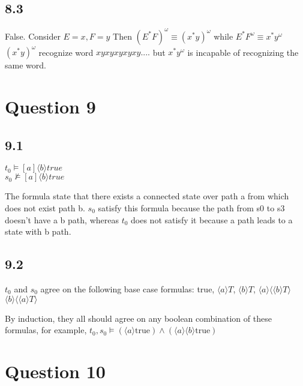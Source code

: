 \documentclass[a4paper, 11pt]{article}
\begin{document}
\subsection*{8.3}
False. Consider $E = x, F = y$ Then $(E^*F)^\omega \equiv (x^*y)^\omega$ while $E^*F^\omega \equiv x^*y^\omega$ $(x^*y)^\omega$ recognize word $xyxyxyxyxy....$ but $x^*y^\omega$ is incapable of recognizing the same word.

\section*{Question 9}
\subsection*{9.1}
$t_0 \models [a] \langle b \rangle true$ \\
$s_0 \not\models [a]  \langle b \rangle true$

The formula state that there exists a connected state over path a from which does not exist path b. $s_0$ satisfy this formula because the path from s0 to s3 doesn't have a b path, whereas $t_0$ does not satisfy it because a path leads to a state with b path.


\subsection*{9.2}
$t_0$ and $s_0$ agree on the following base case formulas:
true, $\langle a \rangle T$, $\langle b \rangle T$, $\langle a \rangle \langle\langle b \rangle T\rangle$ $\langle b \rangle \langle\langle a\rangle T\rangle$

By induction, they all should agree on any boolean combination of these formulas, for example, $t_0, s_0 \models (\langle a \rangle \text{true} ) \land (\langle a \rangle \langle b \rangle \text{true})$

\section*{Question 10}

\end{document}

